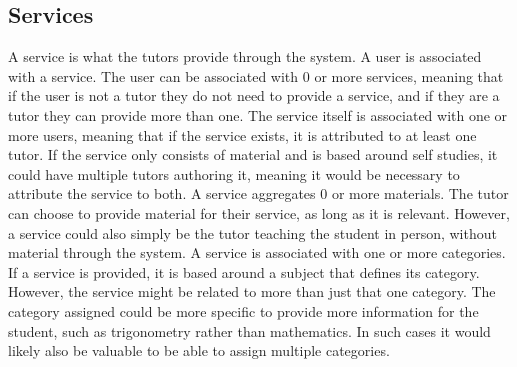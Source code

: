 \subsection{Services}
A service is what the tutors provide through the system. 
A user is associated with a service.
The user can be associated with 0 or more services, meaning that if the user is not a tutor they do not need to provide a service, and if they are a tutor they can provide more than one. 
The service itself is associated with one or more users, meaning that if the service exists, it is attributed to at least one tutor.
If the service only consists of material and is based around self studies, it could have multiple tutors authoring it, meaning it would be necessary to attribute the service to both.
A service aggregates 0 or more materials. 
The tutor can choose to provide material for their service, as long as it is relevant. 
However, a service could also simply be the tutor teaching the student in person, without material through the system.
A service is associated with one or more categories.
If a service is provided, it is based around a subject that defines its category.
However, the service might be related to more than just that one category.
The category assigned could be more specific to provide more information for the student, such as trigonometry rather than mathematics.
In such cases it would likely also be valuable to be able to assign multiple categories.